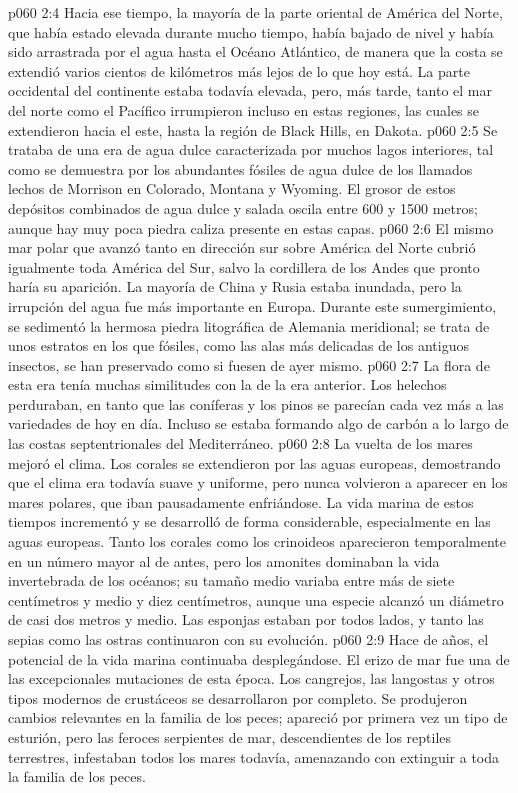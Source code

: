 \vs p060 2:4 Hacia ese tiempo, la mayoría de la parte oriental de América del Norte, que había estado elevada durante mucho tiempo, había bajado de nivel y había sido arrastrada por el agua hasta el Océano Atlántico, de manera que la costa se extendió varios cientos de kilómetros más lejos de lo que hoy está. La parte occidental del continente estaba todavía elevada, pero, más tarde, tanto el mar del norte como el Pacífico irrumpieron incluso en estas regiones, las cuales se extendieron hacia el este, hasta la región de Black Hills, en Dakota.
\vs p060 2:5 Se trataba de una era de agua dulce caracterizada por muchos lagos interiores, tal como se demuestra por los abundantes fósiles de agua dulce de los llamados lechos de Morrison en Colorado, Montana y Wyoming. El grosor de estos depósitos combinados de agua dulce y salada oscila entre 600 y 1500 metros; aunque hay muy poca piedra caliza presente en estas capas.
\vs p060 2:6 El mismo mar polar que avanzó tanto en dirección sur sobre América del Norte cubrió igualmente toda América del Sur, salvo la cordillera de los Andes que pronto haría su aparición. La mayoría de China y Rusia estaba inundada, pero la irrupción del agua fue más importante en Europa. Durante este sumergimiento, se sedimentó la hermosa piedra litográfica de Alemania meridional; se trata de unos estratos en los que fósiles, como las alas más delicadas de los antiguos insectos, se han preservado como si fuesen de ayer mismo.
\vs p060 2:7 La flora de esta era tenía muchas similitudes con la de la era anterior. Los helechos perduraban, en tanto que las coníferas y los pinos se parecían cada vez más a las variedades de hoy en día. Incluso se estaba formando algo de carbón a lo largo de las costas septentrionales del Mediterráneo.
\vs p060 2:8 La vuelta de los mares mejoró el clima. Los corales se extendieron por las aguas europeas, demostrando que el clima era todavía suave y uniforme, pero nunca volvieron a aparecer en los mares polares, que iban pausadamente enfriándose. La vida marina de estos tiempos incrementó y se desarrolló de forma considerable, especialmente en las aguas europeas. Tanto los corales como los crinoideos aparecieron temporalmente en un número mayor al de antes, pero los amonites dominaban la vida invertebrada de los océanos; su tamaño medio variaba entre más de siete centímetros y medio y diez centímetros, aunque una especie alcanzó un diámetro de casi dos metros y medio. Las esponjas estaban por todos lados, y tanto las sepias como las ostras continuaron con su evolución.
\vs p060 2:9 \pc Hace  de años, el potencial de la vida marina continuaba desplegándose. El erizo de mar fue una de las excepcionales mutaciones de esta época. Los cangrejos, las langostas y otros tipos modernos de crustáceos se desarrollaron por completo. Se produjeron cambios relevantes en la familia de los peces; apareció por primera vez un tipo de esturión, pero las feroces serpientes de mar, descendientes de los reptiles terrestres, infestaban todos los mares todavía, amenazando con extinguir a toda la familia de los peces.
